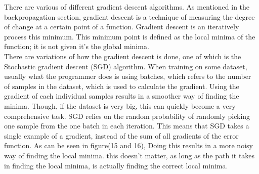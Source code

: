 There are various of different gradient descent algorithms. As mentioned in the backpropagation section, gradient descent is a technique of measuring the degree of change at a certain point of a function. Gradient descent is an iteratively process this minimum. This minimum point is defined as the local minima of the function; it is not given it's the global minima. \\

\noindent
There are variations of how the gradient descent is done, one of which is the Stochastic gradient descent (SGD) algorithm. When training on some dataset, usually what the programmer does is using batches, which refers to the number of samples in the dataset, which is used to calculate the gradient. Using the gradient of each individual samples results in a smoother way of finding the minima. Though, if the dataset is very big, this can quickly become a very comprehensive task. SGD relies on the random probability of randomly picking one sample from the one batch in each iteration. This means that SGD takes a single example of a gradient, instead of the sum of all gradients of the error function. As can be seen in figure(15 and 16), Doing this results in a more noisy way of finding the local minima. this doesn't matter, as long as the path it takes in finding the local minima, is actually finding the correct local minima.





